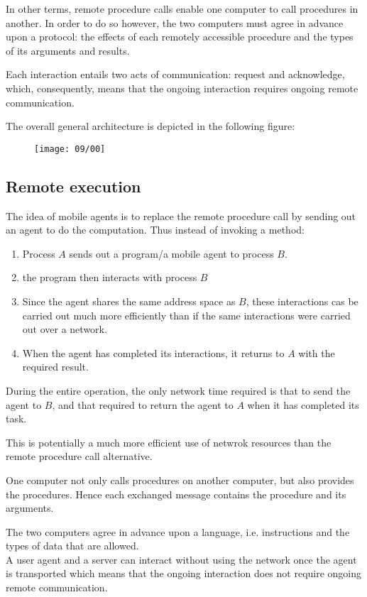 In other terms, remote procedure calls enable one computer to call procedures in another. In order to do so however, the two computers must agree in advance upon a protocol: the effects of each remotely accessible procedure and the types of its arguments and results.

Each interaction entails two acts of communication: request and acknowledge, which, consequently, means that the ongoing interaction requires ongoing remote communication.

The overall general architecture is depicted in the following figure:

\begin{figure}[!h]
\centering
\texttt{[image: 09/00]}
\end{figure}

\subsection{Remote execution}
The idea of mobile agents is to replace the remote procedure call by sending out an agent to do the computation. Thus instead of invoking a method:
\begin{enumerate}
\item Process $A$ sends out a program/a mobile agent to process $B$.
\item the program then interacts with process $B$
\item Since the agent shares the same address space as $B$, these interactions cas be carried out much more efficiently than if the same interactions were carried out over a network.
\item When the agent has completed its interactions, it returns to $A$ with the required result.
\end{enumerate}

During the entire operation, the only network time required is that to send the agent to $B$, and that required to return the agent to $A$ when it has completed its task.

This is potentially a much more efficient use of netwrok resources than the remote procedure call alternative.

One computer not only calls procedures on another computer, but also provides the procedures. Hence each exchanged message contains the procedure and its arguments.

The two computers agree in advance upon a language, i.e. instructions and the types of data that are allowed.\\
A user agent and a server can interact without using the network once the agent is transported which means that the ongoing interaction does not require ongoing remote communication.

